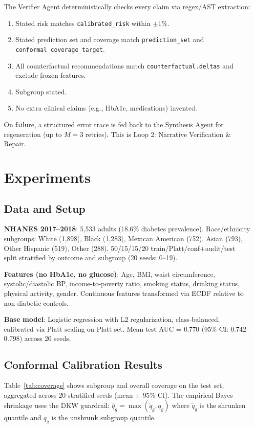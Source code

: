 \documentclass[11pt,a4paper]{article}
\theoremstyle{plain}
\begin{document}
The Verifier Agent deterministically checks every claim via regex/AST extraction:
\begin{enumerate}
    \item Stated risk matches \texttt{calibrated\_risk} within $\pm 1\%$.
    \item Stated prediction set and coverage match \texttt{prediction\_set} and \texttt{conformal\_coverage\_target}.
    \item All counterfactual recommendations match \texttt{counterfactual.deltas} and exclude frozen features.
    \item Subgroup stated.
    \item No extra clinical claims (e.g., HbA1c, medications) invented.
\end{enumerate}
On failure, a structured error trace is fed back to the Synthesis Agent for regeneration (up to $M=3$ retries). This is Loop 2: Narrative Verification \& Repair.

\section{Experiments}

\subsection{Data and Setup}

\textbf{NHANES 2017--2018}: 5,533 adults (18.6\% diabetes prevalence). Race/ethnicity subgroups: White (1,898), Black (1,283), Mexican American (752), Asian (793), Other Hispanic (519), Other (288). 50/15/15/20 train/Platt/conf+audit/test split stratified by outcome and subgroup (20 seeds: 0--19).

\textbf{Features (no HbA1c, no glucose)}: Age, BMI, waist circumference, systolic/diastolic BP, income-to-poverty ratio, smoking status, drinking status, physical activity, gender. Continuous features transformed via ECDF relative to non-diabetic controls.

\textbf{Base model}: Logistic regression with L2 regularization, class-balanced, calibrated via Platt scaling on Platt set. Mean test AUC = 0.770 (95\% CI: 0.742--0.798) across 20 seeds.

\subsection{Conformal Calibration Results}

Table~\ref{tab:coverage} shows subgroup and overall coverage on the test set, aggregated across 20 stratified seeds (mean $\pm$ 95\% CI). The empirical Bayes shrinkage uses the DKW guardrail: $\hat{q}_g = \max(\tilde{q}_g, q_g)$ where $\tilde{q}_g$ is the shrunken quantile and $q_g$ is the unshrunk subgroup quantile.
\end{document}
